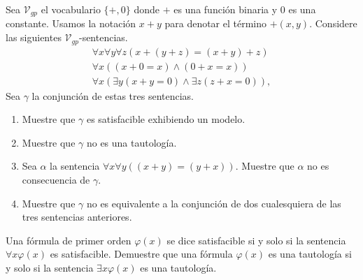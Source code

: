 \message{ !name(main.tex)}\documentclass[12pt,a4paper]{book}
\newcommand{\VV}{\mathcal{V}}
\begin{document}
    \begin{ejercicio}
        Sea $\VV_{gp}$ el vocabulario $\{+,0\}$ donde $+$ es una función binaria y $0$ es una constante. Usamos la
        notación $x+y$ para denotar el término $+(x,y)$. Considere las siguientes $\VV_{gp}$-sentencias.
        \begin{gather*}
            \forall x\forall y\forall z(x+(y+z)=(x+y)+z)\\
            \forall x((x+0=x)\wedge(0+x=x))\\
            \forall x(\exists y(x+y=0)\wedge\exists z(z+x=0)),
        \end{gather*}
        Sea $\gamma$ la conjunción de estas tres sentencias.
        \begin{enumerate}[label=(\alph*)]
            \item Muestre que $\gamma$ es satisfacible exhibiendo un modelo.
            \item Muestre que $\gamma$ no es una tautología.
            \item Sea $\alpha$ la sentencia $\forall x\forall y((x+y)=(y+x))$. Muestre que $\alpha$ no es consecuencia de
            $\gamma$.
            \item Muestre que $\gamma$ no es equivalente a la conjunción de dos cualesquiera de las tres sentencias
            anteriores.
        \end{enumerate}
    \end{ejercicio}

    \begin{ejercicio}\label{ej:satisfacible-formula-abierta}
        Una fórmula de primer orden $\varphi(x)$ se dice satisfacible si y solo si la sentencia $\forall x\varphi(x)$ es
        satisfacible. Demuestre que una fórmula $\varphi(x)$ es una tautología si y solo si la sentencia $\exists x\varphi(x)$
        es una tautología.
    \end{ejercicio}
\end{document}
